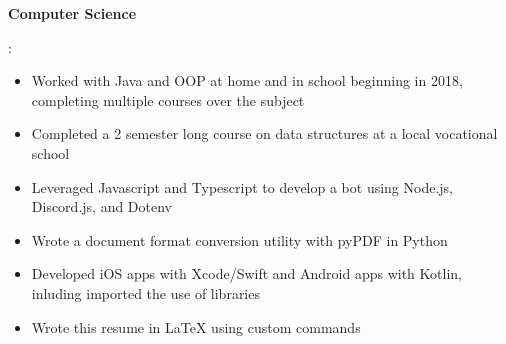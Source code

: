 \documentclass[letterpaper,11pt]{article}
\newcommand{\resumeItem}[2]{
  \item\small{
    \textbf{#1}{: #2 \vspace{-2pt}}
  }
}
\begin{document}
 \resumeItem{Computer Science}
 {
 \begin{itemize}
   \item Worked with Java and OOP at home and in school beginning in 2018, completing multiple courses over the subject
   \item Completed a 2 semester long course on data structures at a local vocational school
   \item Leveraged Javascript and Typescript to develop a bot using Node.js, Discord.js, and Dotenv
   \item Wrote a document format conversion utility with pyPDF in Python 
   \item Developed iOS apps with Xcode/Swift and Android apps with Kotlin, inluding imported the use of libraries
   \item Wrote this resume in LaTeX using custom commands
 \end{itemize}
 }
\end{document}
